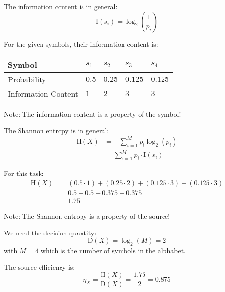 \begin{solution}
	\begin{tasks}
		\task
		The information content is in general:
		\begin{equation*}
			\mathrm{I}(s_i) = \log_2 \left(\frac{1}{p_i}\right)
		\end{equation*}
	
		For the given symbols, their information content is:
		\begin{table}[H]
			\centering
			\begin{tabular}{|l|l|l|l|l|}
				\hline
				Symbol & $s_1$ & $s_2$ & $s_3$ & $s_4$ \\
				\hline
				Probability & $0.5$ & $0.25$ & $0.125$ & $0.125$ \\
				\hline
				Information Content & $1$ & $2$ & $3$ & $3$ \\
				\hline
			\end{tabular}
		\end{table}
	
		Note: The information content is a property of the symbol!
		
		\task
		The Shannon entropy is in general:
		\begin{equation*}
			\begin{split}
				\mathrm{H}(X) &= - \sum\limits_{i=1}^{M} p_i \log_2 \left(p_i\right) \\
				 &= \sum\limits_{i=1}^{M} p_i \cdot \mathrm{I}(s_i)
			\end{split}
		\end{equation*}
	
		For this task:
		\begin{equation*}
			\begin{split}
				\mathrm{H}(X) &= \left(0.5 \cdot 1\right) + \left(0.25 \cdot 2\right) + \left(0.125 \cdot 3\right) + \left(0.125 \cdot 3\right) \\
				 &= 0.5 + 0.5 + 0.375 + 0.375 \\
				 &= 1.75
			\end{split}
		\end{equation*}
	
		Note: The Shannon entropy is a property of the source!
	
		\task
		We need the decision quantity:
		\begin{equation*}
			\mathrm{D}(X) = \log_2 \left(M\right) = 2
		\end{equation*}
		with $M = 4$ which is the number of symbols in the alphabet.
		
		The source efficiency is:
		\begin{equation*}
			\eta_X = \frac{\mathrm{H}(X)}{\mathrm{D}(X)} = \frac{1.75}{2} = 0.875
		\end{equation*}
	\end{tasks}
\end{solution}

